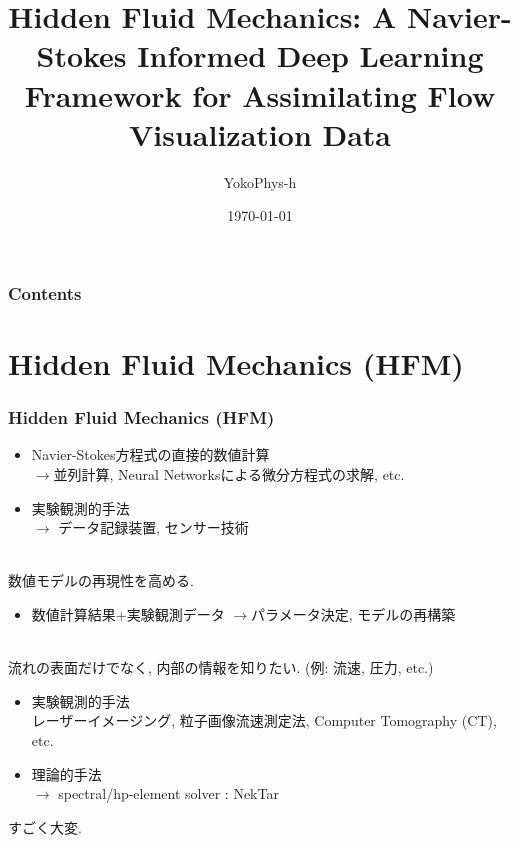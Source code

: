 \documentclass[xcolor=dvipsnames,hyperref={breaklinks=true},mathserif,professionalfont,dvipdfmx,12pt]{beamer}
\title{Hidden Fluid Mechanics: A Navier-Stokes Informed Deep Learning Framework for Assimilating Flow Visualization Data}
\author{YokoPhys-h}
\date{\today}
\institute{hoge大学大学院}
\begin{document}
\begin{frame}[plain]
  \titlepage
\end{frame}
\begin{frame}
  \frametitle{Contents}
  \tableofcontents
\end{frame}


\section{Hidden Fluid Mechanics (HFM)}
\begin{frame}
  \frametitle{Hidden Fluid Mechanics (HFM)}
  \vspace{10pt}
  \begin{itemize}
    \item Navier-Stokes方程式の直接的数値計算\\
    \footnotesize$\rightarrow$並列計算, Neural Networksによる微分方程式の求解, etc.\normalsize 
    \item 実験観測的手法\\
    \footnotesize$\rightarrow$ データ記録装置, センサー技術\normalsize
  \end{itemize}
  \\
  \small 数値モデルの再現性を高める.\normalsize
  \begin{itemize}
    \item 数値計算結果+実験観測データ $\rightarrow$パラメータ決定, モデルの再構築
  \end{itemize}
\end{frame}

\begin{frame}
  \\
  \small 流れの表面だけでなく, 内部の情報を知りたい. (例: 流速, 圧力, etc.)\normalsize
  \begin{itemize}
    \item 実験観測的手法\\
    \footnotesize レーザーイメージング, 粒子画像流速測定法, Computer Tomography (CT), etc.\normalsize
    \item 理論的手法\\
    \footnotesize $\rightarrow$ spectral/hp-element solver : NekTar\normalsize
  \end{itemize}
  すごく大変.
\end{frame}
\end{document}
